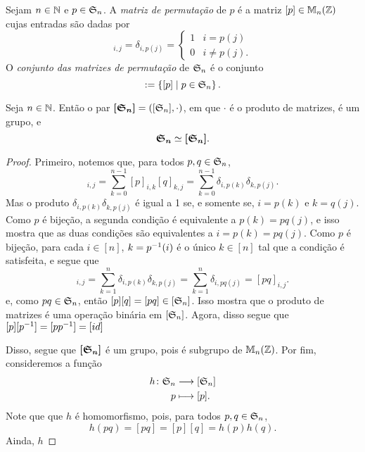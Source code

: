 \begin{definition}
	Sejam $n \in \mathbb{N}$ e $p \in \mathfrak{S}_n$. A \emph{matriz de permutação} de $p$ é a matriz $[p] \in \mathbb{M}_n (\mathbb{Z})$ cujas entradas são dadas por
	\begin{equation*}
		[p]_{i,j} = \delta_{i,p(j)} = \begin{cases}
												1 & i=p(j) \\
												0 & i \neq p(j).
												\end{cases}
	\end{equation*}
	O \emph{conjunto das matrizes de permutação} de $\mathfrak{S}_n$ é o conjunto
	\begin{equation*}
		[\sime_n] := \set{[p]}{p \in \sime_n}.
	\end{equation*}
\end{definition}

\begin{proposition}
	Seja $n \in \mathbb{N}$. Então o par $\bm{[\mathfrak{S}_n]}=([\mathfrak{S}_n],\cdot)$, em que $\cdot$ é o produto de matrizes, é um grupo, e
	\begin{equation*}
	\bm{\mathfrak{S}_n} \simeq \bm{[\mathfrak{S}_n]}.
	\end{equation*}
\end{proposition}
\begin{proof}
	Primeiro, notemos que, para todos $p,q \in \mathfrak{S}_n$,
	\begin{equation*}
	[p][q]_{i,j} = \sum_{k=0}^{n-1} [p]_{i,k}[q]_{k,j} = \sum_{k=0}^{n-1} \delta_{i,p(k)}\delta_{k,p(j)}.
	\end{equation*}
	Mas o produto $\delta_{i,p(k)}\delta_{k,p(j)}$ é igual a 1 se, e somente se, $i=p(k)$ e $k=q(j)$. Como $p$ é bijeção, a segunda condição é equivalente a $p(k)=pq(j)$, e isso mostra que as duas condições são equivalentes a $i=p(k)=pq(j)$. Como $p$ é bijeção, para cada $i \in [n]$, $k=p^{-1}(i)$ é o único $k \in [n]$ tal que a condição é satisfeita, e segue que
	\begin{equation*}
	[p][q]_{i,j} = \sum_{k=1}^n \delta_{i,p(k)}\delta_{k,p(j)} = \sum_{k=1}^n \delta_{i,pq(j)} = [pq]_{i,j}.
	\end{equation*}
e, como $pq \in \mathfrak{S}_n$, então $[p][q]=[pq] \in [\mathfrak{S}_n]$. Isso mostra que o produto de matrizes é uma operação binária em $[\mathfrak{S}_n]$. Agora, disso segue que $[p][p^{-1}]=[pp^{-1}]=[id]$





Disso, segue que $\bm{[\mathfrak{S}_n]}$ é um grupo, pois é subgrupo de $\mathbb{M}_n(\mathbb{Z})$. Por fim, consideremos a função
	\begin{align*}
	{h}\colon {\mathfrak{S}_n} &\longrightarrow {[\mathfrak{S}_n]} \\{p} &\longmapsto [p].
	\end{align*}
Note que que $h$ é homomorfismo, pois, para todos $p,q \in \mathfrak{S}_n$,
	\begin{equation*}
	h(pq) = [pq]= [p][q] = h(p)h(q).
	\end{equation*}
Ainda, $h$
\end{proof}

